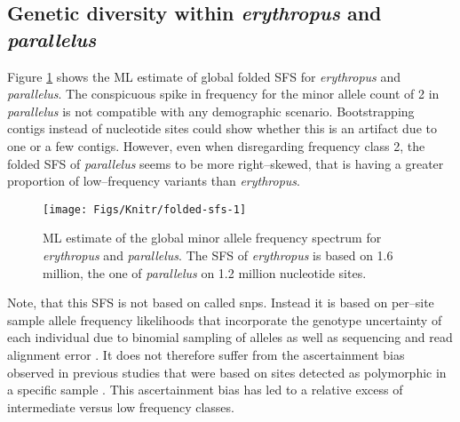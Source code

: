 \documentclass[a4paper,12pt,times,authoryear,twoside,print,index]{Classes/PhDThesisPSnPDF}\usepackage[]{graphicx}\usepackage[]{color}
\newenvironment{knitrout}{}{} %
\begin{document}
\subsection{Genetic diversity within \textit{erythropus} and \textit{parallelus}}
%
%
Figure \ref{Fig:folded-sfs} shows the ML estimate of global folded \gls{SFS} for \textit{erythropus} and \textit{parallelus}. The conspicuous spike in frequency for the minor allele count of 2 in \textit{parallelus} is not compatible with any demographic scenario. Bootstrapping contigs instead of nucleotide sites could show whether this is an artifact due to one or a few contigs. However, even when disregarding frequency class 2, the folded \gls{SFS} of \textit{parallelus} seems to be more right--skewed, that is having a greater proportion of low--frequency variants than \textit{erythropus}. 
%
\begin{figure}[htb]
\centering
\begin{knitrout}
\color{fgcolor}

{\centering \texttt{[image: Figs/Knitr/folded-sfs-1]} 

}



\end{knitrout}
\caption{ML estimate of the global minor allele frequency spectrum for \textit{erythropus} and \textit{parallelus}. The \gls{SFS} of  \textit{erythropus} is based on 1.6 million, the one of \textit{parallelus} on 1.2 million nucleotide sites.}
\label{Fig:folded-sfs}
\end{figure}
%
Note, that this \gls{SFS} is not based on called \glspl{snp}. Instead it is based on per--site sample allele frequency likelihoods that incorporate the genotype uncertainty of each individual due to binomial sampling of alleles as well as sequencing and read alignment error \citep{Li2008, Li2011, Nielsen2012}. It does not therefore suffer from the ascertainment bias observed in previous studies that were based on sites detected as polymorphic in a specific sample \citep{Albrechtsen2010, Korneliussen2013}. This ascertainment bias has led to a relative excess of intermediate versus low frequency classes. 
\end{document}
